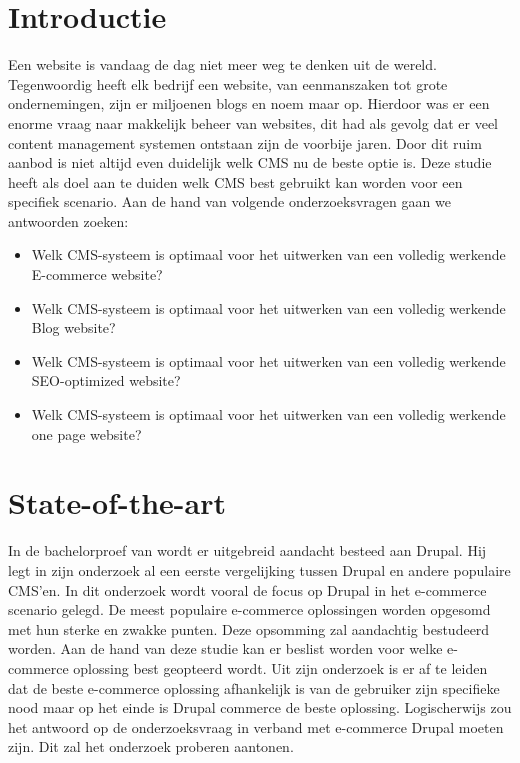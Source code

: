 
\section{Introductie} %
\label{sec:introductie}

Een website is vandaag de dag niet meer weg te denken uit de wereld. Tegenwoordig heeft elk bedrijf een website, van eenmanszaken tot grote ondernemingen, zijn er miljoenen blogs en noem maar op. Hierdoor was er een enorme vraag naar makkelijk beheer van websites, dit had als gevolg dat er veel content management systemen ontstaan zijn de voorbije jaren. Door dit ruim aanbod is niet altijd even duidelijk welk CMS nu de beste optie is. Deze studie heeft als doel aan te duiden welk CMS best gebruikt kan worden voor een specifiek scenario. Aan de hand van volgende onderzoeksvragen gaan we antwoorden zoeken:
\begin{itemize}
	\item Welk CMS-systeem is optimaal voor het uitwerken van een volledig werkende E-commerce website?
	\item Welk CMS-systeem is optimaal voor het uitwerken van een volledig werkende Blog website?
	\item Welk CMS-systeem is optimaal voor het uitwerken van een volledig werkende SEO-optimized website?
	\item Welk CMS-systeem is optimaal voor het uitwerken van een volledig werkende one page website?
\end{itemize}

\section{State-of-the-art}
\label{sec:state-of-the-art}

In de bachelorproef van \textcite{Crombrugge2015} wordt er uitgebreid aandacht besteed aan Drupal. Hij legt in zijn onderzoek al een eerste vergelijking tussen Drupal en andere populaire CMS'en. In dit onderzoek wordt vooral de focus op Drupal in het e-commerce scenario gelegd. De meest populaire e-commerce oplossingen worden opgesomd met hun sterke en zwakke punten. Deze opsomming zal aandachtig bestudeerd worden. Aan de hand van deze studie kan er beslist worden voor welke e-commerce oplossing best geopteerd wordt. Uit zijn onderzoek is er af te leiden dat de beste e-commerce oplossing afhankelijk is van de gebruiker zijn specifieke nood maar op het einde is Drupal commerce de beste oplossing. Logischerwijs zou het antwoord op de onderzoeksvraag in verband met e-commerce Drupal moeten zijn. Dit zal het onderzoek proberen aantonen.

